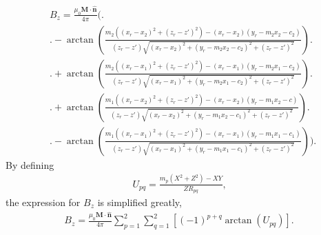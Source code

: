 \begin{align}
    &B_z = \frac{\mu_0\mathbf{M}\cdot\hat{\mathbf{n}}}{4\pi} \Bigg( \Bigg. \nonumber \\
    & \Bigg. -\arctan \left( \frac{m_2\left(\left(x_r-x_2\right)^2+\left(z_r-z'\right)^2\right)-\left(x_r-x_2\right)\left(y_r-m_2x_2-c_2\right)}{\left(z_r-z'\right)\sqrt{\left(x_r-x_2\right)^2+\left(y_r-m_2x_2-c_2\right)^2+\left(z_r-z'\right)^2}} \right) \Bigg. \nonumber \\
    & \Bigg. +\arctan \left( \frac{m_2\left(\left(x_r-x_1\right)^2+\left(z_r-z'\right)^2\right)-\left(x_r-x_1\right)\left(y_r-m_2x_1-c_2\right)}{\left(z_r-z'\right)\sqrt{\left(x_r-x_1\right)^2+\left(y_r-m_2x_1-c_2\right)^2+\left(z_r-z'\right)^2}} \right) \Bigg. \nonumber \\
    & \Bigg. +\arctan \left( \frac{m_1\left(\left(x_r-x_2\right)^2+\left(z_r-z'\right)^2\right)-\left(x_r-x_2\right)\left(y_r-m_1x_2-c\right)}{\left(z_r-z'\right)\sqrt{\left(x_r-x_2\right)^2+\left(y_r-m_1x_2-c_1\right)^2+\left(z_r-z'\right)^2}} \right) \Bigg. \nonumber \\
    & \Bigg. -\arctan \left( \frac{m_1\left(\left(x_r-x_1\right)^2+\left(z_r-z'\right)^2\right)-\left(x_r-x_1\right)\left(y_r-m_1x_1-c_1\right)}{\left(z_r-z'\right)\sqrt{\left(x_r-x_1\right)^2+\left(y_r-m_1x_1-c_1\right)^2+\left(z_r-z'\right)^2}} \right) \Bigg) \text{.}
\end{align}
By defining
\begin{align}
    U_{pq} = \frac{m_p\left(X^2+Z^2\right)-XY}{ZR_{pq}} \text{,}
\end{align}
the expression for \(B_z\) is simplified greatly,
\begin{align}
    B_z = \frac{\mu_0\mathbf{M}\cdot\hat{\mathbf{n}}}{4\pi} \sum_{p=1}^2 \sum_{q=1}^2 \left[ \left(-1\right)^{p+q} \arctan \left(U_{pq}\right) \right] \text{.}
\end{align}

